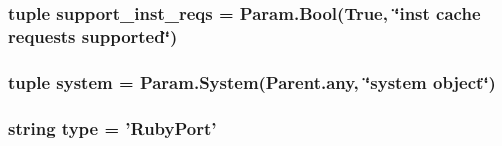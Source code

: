 \label{classSequencer_1_1RubyPort_aa05c4974d49163b7fb2ec88b78b62739}
\hypertarget{classSequencer_1_1RubyPort_a312bbed96f73418127191c748163adcb}{
\subsubsection[{support\_\-inst\_\-reqs}]{\setlength{\rightskip}{0pt plus 5cm}tuple {\bf support\_\-inst\_\-reqs} = Param.Bool(True, \char`\"{}inst cache requests supported\char`\"{})}}
\label{classSequencer_1_1RubyPort_a312bbed96f73418127191c748163adcb}
\hypertarget{classSequencer_1_1RubyPort_ab737471139f5a296e5b26e8a0e1b0744}{
\subsubsection[{system}]{\setlength{\rightskip}{0pt plus 5cm}tuple {\bf system} = Param.System(Parent.any, \char`\"{}system object\char`\"{})}}
\label{classSequencer_1_1RubyPort_ab737471139f5a296e5b26e8a0e1b0744}
\hypertarget{classSequencer_1_1RubyPort_acce15679d830831b0bbe8ebc2a60b2ca}{
\subsubsection[{type}]{\setlength{\rightskip}{0pt plus 5cm}string {\bf type} = '{\bf RubyPort}'}}
\label{classSequencer_1_1RubyPort_acce15679d830831b0bbe8ebc2a60b2ca}


